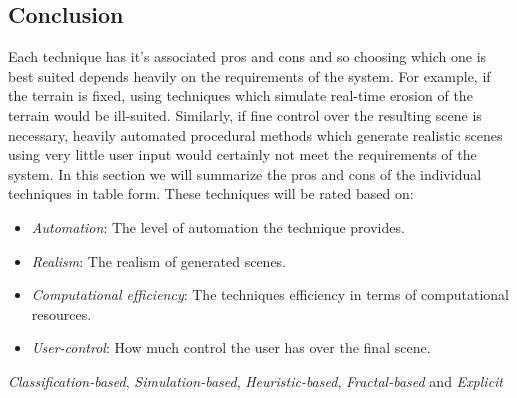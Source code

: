 \subsection{Conclusion} \label{Conclusion}

Each technique has it's associated pros and cons and so choosing which one is best suited depends heavily on the requirements of the system. For example, if the terrain is fixed, using techniques which simulate real-time erosion of the terrain would be ill-suited. Similarly, if fine control over the resulting scene is necessary, heavily automated procedural methods which generate realistic scenes using very little user input would certainly not meet the requirements of the system. In this section we will summarize the pros and cons of the individual techniques in table form. These techniques will be rated based on:
\begin{itemize}
\item \textit{Automation}: The level of automation the technique provides.
\item \textit{Realism}: The realism of generated scenes.
\item \textit{Computational efficiency}: The techniques efficiency in terms of computational resources.
\item \textit{User-control}: How much control the user has over the final scene. 
\end{itemize}

\textit{Classification-based}, \textit{Simulation-based}, \textit{Heuristic-based}, \textit{Fractal-based} and \textit{Explicit}

